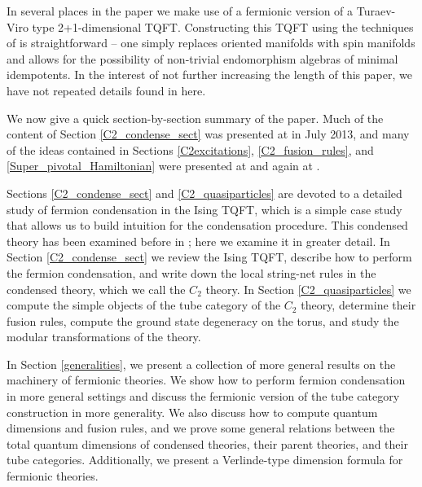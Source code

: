 In several places in the paper we make use of a fermionic version of a Turaev-Viro type 2+1-dimensional TQFT.
Constructing this TQFT using the techniques of \cite{Walker2006} is straightforward -- one simply replaces oriented manifolds with
spin manifolds and allows for the possibility of non-trivial endomorphism algebras of minimal idempotents.
In the interest of not further increasing the length of this paper, we have not repeated details found in
\cite{Walker2006} here.

\medskip

We now give a quick section-by-section summary of the paper.
Much of the content of Section \ref{C2_condense_sect} was presented at \cite{Walker2013} in July 2013,
and many of the ideas contained in Sections \ref{C2excitations}, \ref{C2_fusion_rules}, and \ref{Super_pivotal_Hamiltonian} were presented at \cite{Walker2014} and again
at \cite{Walker2015}.

Sections \ref{C2_condense_sect} and \ref{C2_quasiparticles} are devoted to a detailed study of 
fermion condensation in the Ising TQFT, which is a simple case study that allows us to build intuition for the condensation procedure.
This condensed theory has been examined before in \cite{bhardwaj2016, kapustin2017}; 
here we examine it in greater detail. 
In Section \ref{C2_condense_sect} we review the Ising TQFT, describe how to perform the 
fermion condensation, and write down the local string-net rules in the condensed theory, 
which we call the $C_2$ theory. 
In Section \ref{C2_quasiparticles} we compute the simple objects of the tube category of the $C_2$ theory,
determine their fusion rules,
compute the ground state degeneracy on the torus, 
and study the modular transformations %
of the theory. 

In Section \ref{generalities}, we present a collection of more general results
on the machinery of fermionic theories. 
We show how to perform fermion condensation in more general settings
and discuss the fermionic version 
of the tube category construction in more generality.
We also discuss how to compute quantum dimensions and fusion rules,
and we prove some general
relations between the total quantum dimensions of condensed theories, their 
parent theories, and their tube categories.
Additionally, we present a Verlinde-type
dimension formula for fermionic theories.

